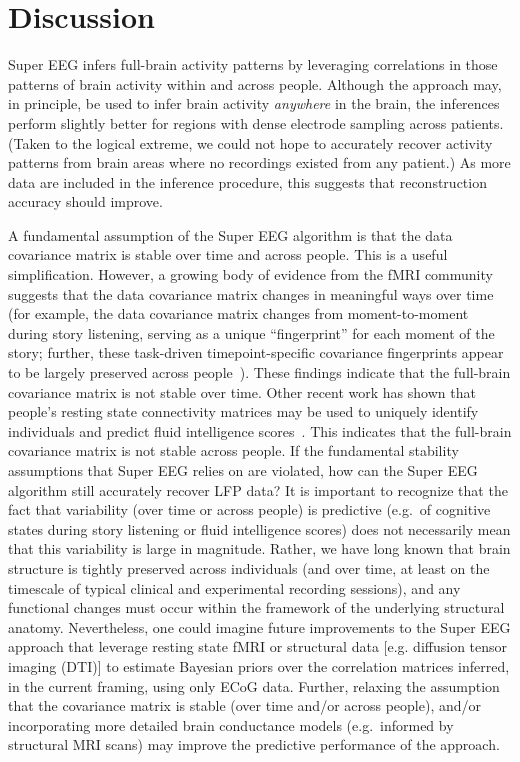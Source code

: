 \documentclass[12pt]{article}
\begin{document}
\section*{Discussion}
Super EEG infers full-brain activity patterns by leveraging
correlations in those patterns of brain activity within and across people.  Although
the approach may, in principle, be used to infer brain activity
\textit{anywhere} in the brain, the inferences perform slightly better for
regions with dense electrode sampling across patients.  (Taken to the logical extreme, we could not hope to accurately recover activity patterns from brain areas where no recordings existed from any patient.)   As more data
are included in the inference procedure, this suggests that reconstruction accuracy should improve.

A fundamental assumption of the Super EEG algorithm is that the data
covariance matrix is stable over time and across people.  This is a
useful simplification.  However, a growing body of evidence from the
fMRI community suggests that the data covariance matrix changes in
meaningful ways over time (for example, the data covariance matrix
changes from moment-to-moment during story listening, serving as a
unique ``fingerprint'' for each moment of the story; further, these
task-driven timepoint-specific covariance fingerprints appear to be
largely preserved across people~\cite{SimoEtal16, MannEtal17}).  These
findings indicate that the full-brain covariance matrix is not stable
over time.  Other recent work has shown that people's resting state
connectivity matrices may be used to uniquely identify individuals and
predict fluid intelligence scores~\cite{FinnEtal15}.  This indicates
that the full-brain covariance matrix is not stable across people.  If
the fundamental stability assumptions that Super EEG relies on are
violated, how can the Super EEG algorithm still accurately recover LFP
data?  It is important to recognize that the fact that variability
(over time or across people) is predictive (e.g.\ of cognitive states
during story listening or fluid intelligence scores) does not
necessarily mean that this variability is large in magnitude.  Rather,
we have long known that brain structure is tightly preserved across
individuals (and over time, at least on the timescale of typical
clinical and experimental recording sessions), and any functional
changes must occur within the framework of the underlying structural
anatomy.  Nevertheless, one could imagine future improvements to the
Super EEG approach that leverage resting state fMRI or structural data
[e.g. diffusion tensor imaging (DTI)] to estimate Bayesian priors over
the correlation matrices inferred, in the current framing, using only
ECoG data.  Further, relaxing the assumption that the covariance
matrix is stable (over time and/or across people), and/or
incorporating more detailed brain conductance models (e.g.\ informed
by structural MRI scans) may improve the predictive performance of the
approach.
\end{document}
